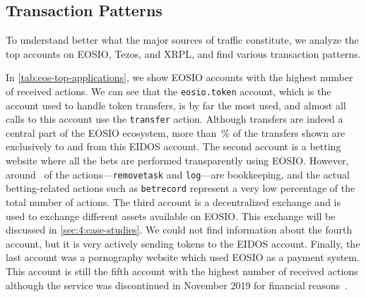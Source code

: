 


 



\subsection{Transaction Patterns}
To understand better what the major sources of traffic constitute, we analyze the top accounts on EOSIO, Tezos, and XRPL, and find various transaction patterns.

In \autoref{tab:eos-top-applications}, we show EOSIO accounts with the highest number of received actions.
We can see that the \texttt{eosio.token} account, which is the account used to handle  token transfers, is by far the most used, and almost all calls to this account use the \texttt{transfer} action.
Although  transfers are indeed a central part of the EOSIO ecosystem, more than~\% of the transfers shown are exclusively to and from this EIDOS account.
The second account is a betting website where all the bets are performed transparently using EOSIO.
However, around~ of the actions---\texttt{removetask} and \texttt{log}---are bookkeeping, and the actual betting-related actions such as \texttt{betrecord} represent a very low percentage of the total number of actions.
The third account is a decentralized exchange and is used to exchange different assets available on EOSIO. This exchange will be discussed in \autoref{sec:4:case-studies}.
We could not find information about the fourth account, but it is very actively sending  tokens to the EIDOS account.
Finally, the last account was a pornography website which used EOSIO as a payment system. This account is still the fifth account with the highest number of received actions although the service was discontinued in November 2019 for financial reasons~\cite{hashbaby-closing}.


